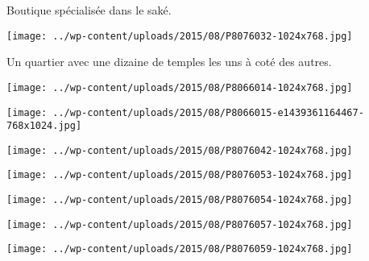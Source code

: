  

 Boutique spécialisée dans le saké. 

 

\begin{center} \texttt{[image: ../wp-content/uploads/2015/08/P8076032-1024x768.jpg]} \end{center}

 

 Un quartier avec une dizaine de temples les uns à coté des autres. 

 

\begin{center} \texttt{[image: ../wp-content/uploads/2015/08/P8066014-1024x768.jpg]} \end{center}

 

 

\begin{center} \texttt{[image: ../wp-content/uploads/2015/08/P8066015-e1439361164467-768x1024.jpg]} \end{center}

 

 

\begin{center} \texttt{[image: ../wp-content/uploads/2015/08/P8076042-1024x768.jpg]} \end{center}

 

 

\begin{center} \texttt{[image: ../wp-content/uploads/2015/08/P8076053-1024x768.jpg]} \end{center}

 

 

\begin{center} \texttt{[image: ../wp-content/uploads/2015/08/P8076054-1024x768.jpg]} \end{center}

 

 

\begin{center} \texttt{[image: ../wp-content/uploads/2015/08/P8076057-1024x768.jpg]} \end{center}

 

 

\begin{center} \texttt{[image: ../wp-content/uploads/2015/08/P8076059-1024x768.jpg]} \end{center}

